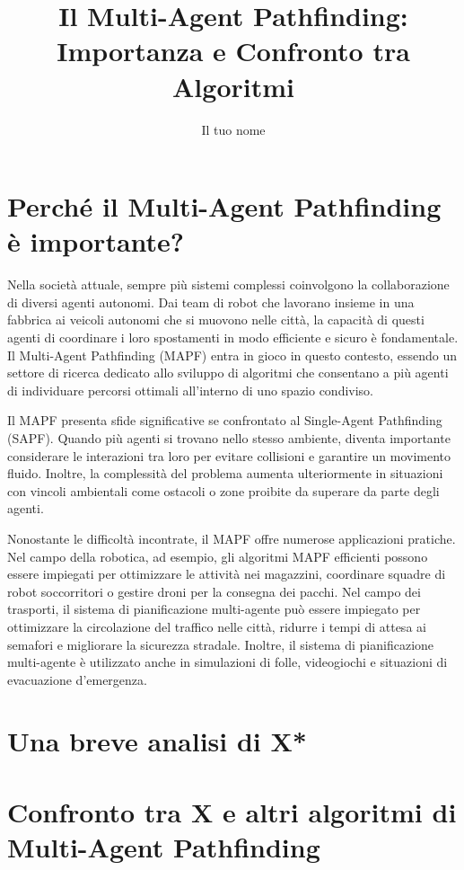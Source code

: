 \documentclass{article}
\title{Il Multi-Agent Pathfinding: Importanza e Confronto tra Algoritmi}
\author{Il tuo nome}
\date{}
\begin{document}
\maketitle

\section*{Perché il Multi-Agent Pathfinding è importante?}

Nella società attuale, sempre più sistemi complessi coinvolgono la collaborazione di diversi agenti autonomi. Dai team di robot che lavorano insieme in una fabbrica ai veicoli autonomi che si muovono nelle città, la capacità di questi agenti di coordinare i loro spostamenti in modo efficiente e sicuro è fondamentale. Il Multi-Agent Pathfinding (MAPF) entra in gioco in questo contesto, essendo un settore di ricerca dedicato allo sviluppo di algoritmi che consentano a più agenti di individuare percorsi ottimali all'interno di uno spazio condiviso.

Il MAPF presenta sfide significative se confrontato al Single-Agent Pathfinding (SAPF). Quando più agenti si trovano nello stesso ambiente, diventa importante considerare le interazioni tra loro per evitare collisioni e garantire un movimento fluido. Inoltre, la complessità del problema aumenta ulteriormente in situazioni con vincoli ambientali come ostacoli o zone proibite da superare da parte degli agenti.

Nonostante le difficoltà incontrate, il MAPF offre numerose applicazioni pratiche. Nel campo della robotica, ad esempio, gli algoritmi MAPF efficienti possono essere impiegati per ottimizzare le attività nei magazzini, coordinare squadre di robot soccorritori o gestire droni per la consegna dei pacchi.
Nel campo dei trasporti, il sistema di pianificazione multi-agente può essere impiegato per ottimizzare la circolazione del traffico nelle città, ridurre i tempi di attesa ai semafori e migliorare la sicurezza stradale. Inoltre, il sistema di pianificazione multi-agente è utilizzato anche in simulazioni di folle, videogiochi e situazioni di evacuazione d'emergenza.

\section*{Una breve analisi di X*}

\section*{Confronto tra X e altri algoritmi di Multi-Agent Pathfinding}
\end{document}
